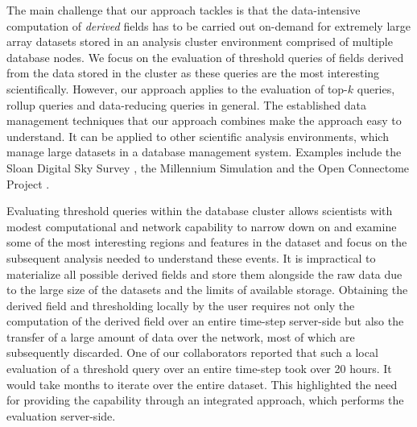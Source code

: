\documentclass{sig-alternate}
\begin{document}
The main challenge that our approach tackles is that the
data-intensive computation of \emph{derived} fields has to be carried out on-demand for extremely large array datasets stored in an analysis cluster environment 
comprised of multiple database nodes. We focus on the evaluation of threshold queries of fields derived from the data stored in the cluster as
these queries are the most interesting scientifically. However, our approach applies to the evaluation of top-$k$ queries, rollup queries and data-reducing 
queries in general. The established data management techniques that our approach combines make the approach easy to understand. It can be applied to other 
scientific analysis environments, which manage large datasets in a database management system. Examples include the Sloan Digital Sky Survey
\cite{SDSS}, the Millennium Simulation \cite{Millennium} and the Open Connectome Project \cite{Burns}.

Evaluating threshold queries within the database cluster allows scientists with modest computational and network capability to narrow down on and
examine some of the most interesting regions and features in the dataset and focus on the subsequent analysis needed to understand these events.
It is impractical to materialize all possible derived fields and store them alongside the raw data
due to the large size of the datasets and the limits of available storage.
Obtaining the derived field and thresholding locally by the user requires not only the computation of the derived field over an entire time-step server-side 
but also the transfer of a large amount of data over the network, most of which are subsequently discarded. 
One of our collaborators reported that such a local evaluation of a threshold
query over an entire time-step took over 20 hours. It would take months to iterate over the entire dataset. 
This highlighted the need for providing the capability through an integrated approach, which performs the evaluation server-side.
\end{document}
